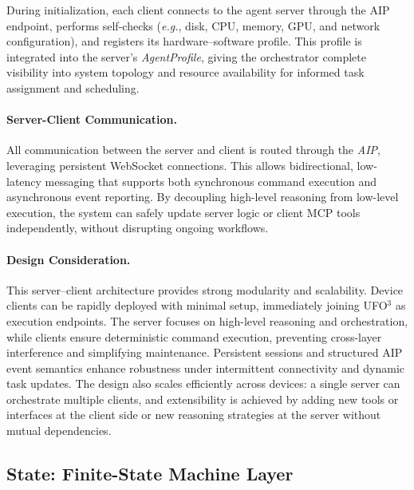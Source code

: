\documentclass[10pt]{article} %
\newcommand{\ufo}{\textsc{UFO}$^3$\xspace}
\newcommand{\eg}{\textit{e.g.},\xspace}
\begin{document}
During initialization, each client connects to the agent server through the AIP endpoint, performs self-checks (\eg disk, CPU, memory, GPU, and network configuration), and registers its hardware–software profile. This profile is integrated into the server's \textit{AgentProfile}, giving the orchestrator complete visibility into system topology and resource availability for informed task assignment and scheduling.


\paragraph{Server-Client Communication.}  
All communication between the server and client is routed through the \emph{AIP}, leveraging persistent WebSocket connections. This allows bidirectional, low-latency messaging that supports both synchronous command execution and asynchronous event reporting. By decoupling high-level reasoning from low-level execution, the system can safely update server logic or client MCP tools independently, without disrupting ongoing workflows.

\paragraph{Design Consideration.}  
This server–client architecture provides strong modularity and scalability. Device clients can be rapidly deployed with minimal setup, immediately joining \ufo as execution endpoints. The server focuses on high-level reasoning and orchestration, while clients ensure deterministic command execution, preventing cross-layer interference and simplifying maintenance. Persistent sessions and structured AIP event semantics enhance robustness under intermittent connectivity and dynamic task updates. The design also scales efficiently across devices: a single server can orchestrate multiple clients, and extensibility is achieved by adding new tools or interfaces at the client side or new reasoning strategies at the server without mutual dependencies.

\subsection{State: Finite-State Machine Layer}
\end{document}
